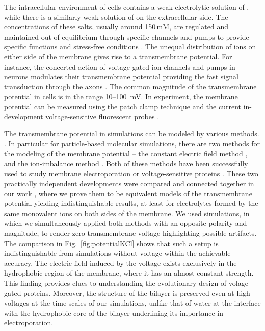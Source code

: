The intracellular environment of cells contains a weak electrolytic solution of , 
while there is a similarly weak solution of  on the extracellular side. 
The concentrations of these salts, usually around 150\,mM, 
are regulated and maintained out of equilibrium through specific channels and pumps 
to provide specific functions and stress-free conditions \citep{Bezanilla2008, Knudsen_book2002}. 
The unequal distribution of ions on either side of the membrane
gives rise to a transmembrane potential. 
For instance, the concerted action of voltage-gated ion channels and pumps in neurons 
modulates their transmembrane potential
providing the fast signal transduction through the axons \citep{Knudsen_book2002, Storace2015, Sung2015}. 
The common magnitude of the transmembrane potential in cells is in the range 10--100~mV. 
In experiment, the membrane potential can be measured using the patch clamp technique \citep{Bezanilla2008}
and the current in-development voltage-sensitive fluorescent probes \citep{Storace2015, Sung2015}. 

The transmembrane potential in simulations can be modeled by various methods. \citep{Tieleman2001,Sin2015, Roux1997, sachs04_potential}.
In particular for particle-based molecular simulations, 
there are two methods for the modeling of the membrane potential --
 the constant electric field method \citep{Roux1997,Roux2008,Gumbart2012}, 
and
 the ion-imbalance method \citep{sachs04_potential,Delemotte2008}. 
Both of these methods have been successfully used to study membrane electroporation or voltage-sensitive proteins \citep{Vargas2012, bockmann_kinetics_2008, gumbart_constant_2012, kutzner_computational_2011, casciola_molecular_2014}. 
These two practically independent developments were compared and connected together in our work \citep{melcr16},
where we prove them to be equivalent models of the transmembrane potential yielding indistinguishable results, 
at least for electrolytes formed by the same monovalent ions on both sides of the membrane. 
We used simulations, 
in which we simultaneously applied both methods
with an opposite polarity and magnitude, 
to render zero transmembrane voltage
highlighting possible artifacts. 
The comparison in Fig.~\ref{fig:potentialKCl} shows 
that such a setup is indistinguishable 
from simulations without voltage within the achievable accuracy. 
The electric field induced by the voltage 
exists exclusively in the hydrophobic region of the membrane,
where it has an almost constant strength. 
This finding provides clues to understanding the evolutionary design of volage-gated proteins. \citep{Vargas2012} 
Moreover,
the structure of the bilayer is preserved even at high voltages at the time scales of our simulations,
unlike that of water at the interface with the hydrophobic core of the bilayer
underlining its importance in electroporation. \citep{bu2017mechanics}

